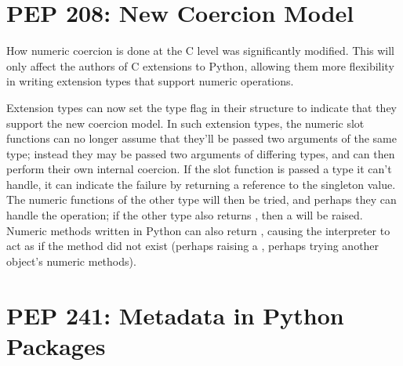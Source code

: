 \documentclass{howto}
\begin{document}
\begin{seealso}


\end{seealso}

\section{PEP 208: New Coercion Model}

How numeric coercion is done at the C level was significantly
modified.  This will only affect the authors of C extensions to
Python, allowing them more flexibility in writing extension types that
support numeric operations.

Extension types can now set the type flag 
in their  structure to indicate that they support
the new coercion model.  In such extension types, the numeric slot
functions can no longer assume that they'll be passed two arguments of
the same type; instead they may be passed two arguments of differing
types, and can then perform their own internal coercion.  If the slot
function is passed a type it can't handle, it can indicate the failure
by returning a reference to the  singleton
value.  The numeric functions of the other type will then be tried,
and perhaps they can handle the operation; if the other type also
returns , then a  will be
raised.  Numeric methods written in Python can also return
, causing the interpreter to act as if the
method did not exist (perhaps raising a , perhaps
trying another object's numeric methods).

\begin{seealso}


\end{seealso}

\section{PEP 241: Metadata in Python Packages}
\end{document}

